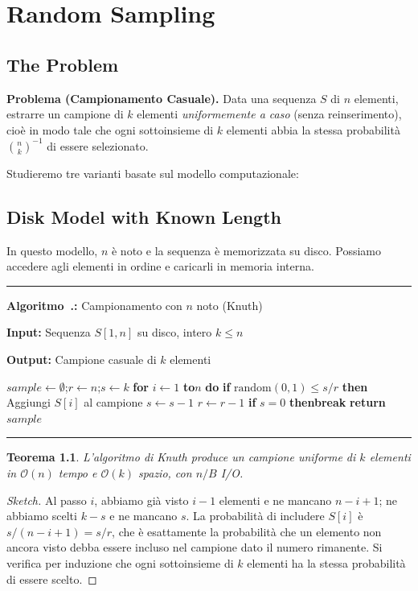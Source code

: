 \documentclass[12pt, a4paper, oneside]{book}
\newcounter{algocf}[chapter]
\renewcommand{\thealgocf}{\thechapter.\arabic{algocf}}
\newenvironment{algorithm}[1][H]{%
  \refstepcounter{algocf}%
  \par\medskip\noindent\rule{\linewidth}{0.4pt}\par\smallskip
}{%
  \par\smallskip\noindent\rule{\linewidth}{0.4pt}\par\medskip
}
\newcommand{\algcaption}[1]{\noindent\textbf{Algoritmo~\thealgocf:} #1\par\smallskip}
\newcommand{\KwIn}[1]{\noindent\textbf{Input:} #1\par}
\newcommand{\KwOut}[1]{\noindent\textbf{Output:} #1\par}
\newcommand{\For}[1]{\noindent\textbf{for} #1 \textbf{do}}
\newcommand{\If}[1]{\noindent\textbf{if} #1 \textbf{then}}
\newcommand{\Return}[1]{\noindent\textbf{return} #1}
\newcommand{\KwTo}{\textbf{to}}
\theoremstyle{plain}
\newtheorem{teorema}{Teorema}[chapter]
\theoremstyle{definition}
\theoremstyle{remark}
\newcommand{\OO}[1]{\mathcal{O}\!\left(#1\right)}
\begin{document}
\chapter{Random Sampling}

\section{The Problem}

\begin{problembox}
\textbf{Problema (Campionamento Casuale).} Data una sequenza $S$ di $n$ elementi, estrarre un campione di $k$ elementi \emph{uniformemente a caso} (senza reinserimento), cioè in modo tale che ogni sottoinsieme di $k$ elementi abbia la stessa probabilità $\binom{n}{k}^{-1}$ di essere selezionato.
\end{problembox}

Studieremo tre varianti basate sul modello computazionale:

\section{Disk Model with Known Length}

In questo modello, $n$ è noto e la sequenza è memorizzata su disco. Possiamo accedere agli elementi in ordine e caricarli in memoria interna.

\begin{algorithm}[H]
\algcaption{Campionamento con $n$ noto (Knuth)}
\KwIn{Sequenza $S[1,n]$ su disco, intero $k \le n$}
\KwOut{Campione casuale di $k$ elementi}
$sample \leftarrow \emptyset$;\quad $r \leftarrow n$;\quad $s \leftarrow k$\;
\For{$i \leftarrow 1$ \KwTo $n$}{
  \If{$\mathrm{random}(0,1) \le s/r$}{
    Aggiungi $S[i]$ al campione\;
    $s \leftarrow s - 1$\;
  }
  $r \leftarrow r - 1$\;
  \If{$s = 0$}{\textbf{break}\;}
}
\Return{$sample$}\;
\end{algorithm}

\begin{teorema}
L'algoritmo di Knuth produce un campione uniforme di $k$ elementi in $\OO{n}$ tempo e $\OO{k}$ spazio, con $n/B$ I/O.
\end{teorema}
\begin{proof}[Sketch]
Al passo $i$, abbiamo già visto $i-1$ elementi e ne mancano $n-i+1$; ne abbiamo scelti $k - s$ e ne mancano $s$. La probabilità di includere $S[i]$ è $s/(n-i+1) = s/r$, che è esattamente la probabilità che un elemento non ancora visto debba essere incluso nel campione dato il numero rimanente. Si verifica per induzione che ogni sottoinsieme di $k$ elementi ha la stessa probabilità di essere scelto.
\end{proof}
\end{document}

